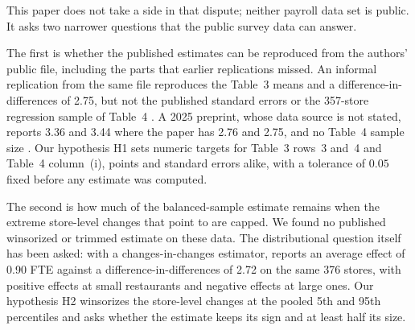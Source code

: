 \documentclass[11pt]{article}
\begin{document}
This paper does not take a side in that dispute; neither payroll data set is public.
It asks two narrower questions that the public survey data can answer.

The first is whether the published estimates can be reproduced from the authors' public
file, including the parts that earlier replications missed. An informal replication from
the same file reproduces the Table~3 means and a difference-in-differences of 2.75, but not
the published standard errors or the 357-store regression sample of Table~4
\citep{mamula2021replicating}. A 2025 preprint, whose data source is not stated, reports 3.36
and 3.44 where the paper has 2.76 and 2.75, and no Table~4 sample size
\citep{morshed2025replication}. Our hypothesis H1 sets numeric targets for
Table~3 rows~3 and~4 and Table~4 column~(i), points and standard errors alike, with a
tolerance of $0.05$ fixed before any estimate was computed.

The second is how much of the balanced-sample estimate remains when the extreme store-level
changes that \citet{neumark1995payroll} point to are capped. We found no published
winsorized or trimmed estimate on these data. The distributional question itself has been
asked: with a changes-in-changes estimator, \citet{ropponen2010cic} reports an average
effect of 0.90 FTE against a difference-in-differences of 2.72 on the same 376 stores, with
positive effects at small restaurants and negative effects at large ones. Our hypothesis H2
winsorizes the store-level changes at the pooled 5th and 95th percentiles and asks whether
the estimate keeps its sign and at least half its size.
\end{document}
